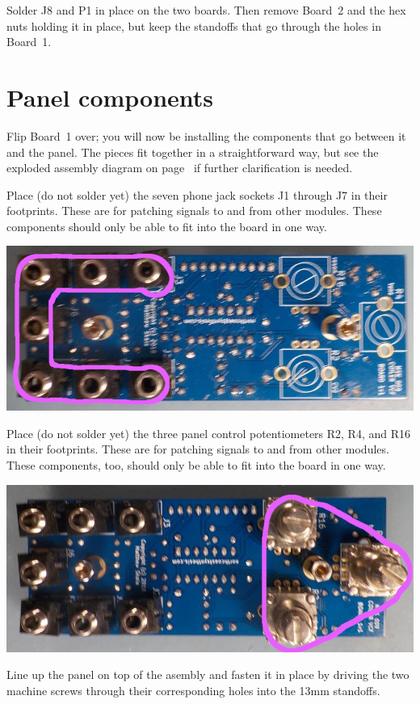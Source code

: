 Solder J8 and P1 in place on the two boards.  Then remove Board~2 and the
hex nuts holding it in place, but keep the standoffs that go through
the holes in Board~1.

\section{Panel components}

Flip Board~1 over; you will now be installing the components that go between
it and the panel.  The pieces fit together in a straightforward way, but
see the exploded assembly diagram on page~\pageref{fig:exploded} if
further clarification is needed.

Place (do not solder yet) the seven phone jack sockets J1 through J7 in
their footprints.  These are for patching signals to and from other modules. 
These components should only be able to fit into the board in one way.

\nopagebreak
\noindent\includegraphics[width=\linewidth]{jack.jpg}

Place (do not solder yet) the three panel control potentiometers R2, R4, and
R16 in their footprints.  These are for patching signals to and from other
modules.  These components, too, should only be able to fit into the board
in one way.

\nopagebreak
\noindent\includegraphics[width=\linewidth]{pot-100k1.jpg}

Line up the panel on top of the asembly and fasten it in place by driving
the two machine screws through their corresponding holes into the 13mm
standoffs.

